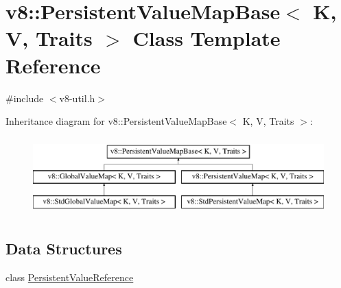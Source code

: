 \hypertarget{classv8_1_1PersistentValueMapBase}{}\section{v8\+:\+:Persistent\+Value\+Map\+Base$<$ K, V, Traits $>$ Class Template Reference}
\label{classv8_1_1PersistentValueMapBase}


{\ttfamily \#include $<$v8-\/util.\+h$>$}

Inheritance diagram for v8\+:\+:Persistent\+Value\+Map\+Base$<$ K, V, Traits $>$\+:\begin{figure}[H]
\begin{center}
\leavevmode
\includegraphics[height=3.000000cm]{classv8_1_1PersistentValueMapBase}
\end{center}
\end{figure}
\subsection*{Data Structures}
\begin{DoxyCompactItemize}
\item 
class \hyperlink{classv8_1_1PersistentValueMapBase_1_1PersistentValueReference}{Persistent\+Value\+Reference}
\end{DoxyCompactItemize}
